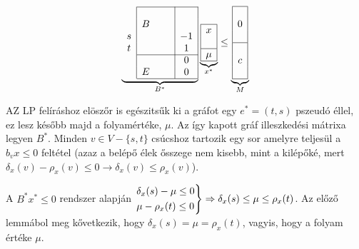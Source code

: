 \begin{wrapfigure}{L}{0.35\textwidth}
  \begin{center}
    \vspace{-1.3cm}
\begin{displaymath}
\underbrace{
\begin{array}{c|ccc|c|}
\cline{2-5}
   &   & & & \\
   &  B& & & \\
 s &   & & &-1 \\
 t &   & & & 1 \\ 
 \cline{2-5}
   &   & & & 0 \\
   & E & & & 0 \\
\cline{2-5}
\end{array}}_{B^*}
\underbrace{
\begin{array}{|c|}
\hline
x\\
\\
\hline
\mu\\
\hline
\end{array}}_{x^*}
\leq
\underbrace{
\begin{array}{|c|}
\hline
\\
0\\
\\
\hline
\\
c\\
\\
\hline
\end{array}}_{M}
\end{displaymath}
  \vspace{-1.3cm}
  \end{center}
\end{wrapfigure}

AZ LP felíráshoz elöszőr is egészitsűk ki a gráfot egy $e^*=(t,s)$ pszeudó éllel, ez lesz 
később majd a folyamértéke, $\mu$. Az így kapott gráf illeszkedési mátrixa legyen $B^*$.
Minden $v \in V - \{s,t\}$ csúcshoz tartozik egy sor amelyre teljesül a $b_vx\leq 0$ feltétel 
(azaz a belépő élek ősszege nem kisebb, mint a kilépőké, mert $\delta_x(v) - \rho_x(v) \leq 
0 \rightarrow \delta_x(v) \leq \rho_x(v)$). 

A $B^*x^* \leq 0$ rendszer alapján $\begin{rcases} \delta_x(s)-\mu \leq 0 \\
\mu - \rho_x(t) \leq 0 \end{rcases} \Rightarrow \delta_x(s) \leq \mu \leq
\rho_x(t)$. Az előző lemmábol meg kővetkezik, hogy $\delta_x(s)=\mu=\rho_x(t)$, 
vagyis, hogy a folyam értéke $\mu$. 

